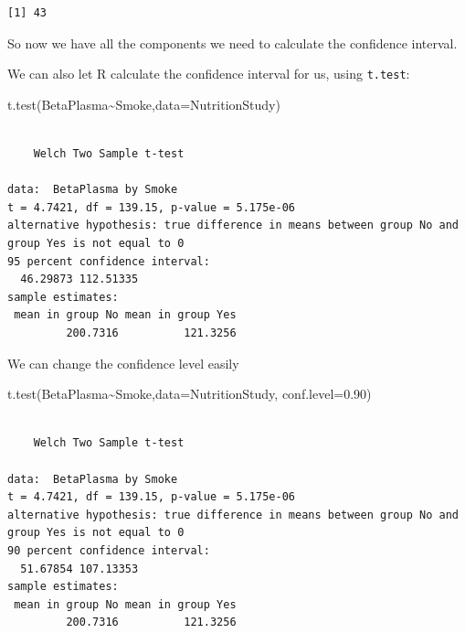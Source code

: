 \documentclass[
  letterpaper,
  DIV=11,
  numbers=noendperiod]{scrartcl}
\newenvironment{Shaded}{\begin{snugshade}}{\end{snugshade}}
\newcommand{\AttributeTok}[1]{\textcolor[rgb]{0.40,0.45,0.13}{#1}}
\newcommand{\FloatTok}[1]{\textcolor[rgb]{0.68,0.00,0.00}{#1}}
\newcommand{\FunctionTok}[1]{\textcolor[rgb]{0.28,0.35,0.67}{#1}}
\newcommand{\NormalTok}[1]{\textcolor[rgb]{0.00,0.23,0.31}{#1}}
\newcommand{\SpecialCharTok}[1]{\textcolor[rgb]{0.37,0.37,0.37}{#1}}
\begin{document}
\begin{verbatim}
[1] 43
\end{verbatim}

So now we have all the components we need to calculate the confidence
interval.

\hfill\break
\hfill\break
\hfill\break
\hfill\break
\hfill\break
\hfill\break
\hfill\break
\hfill\break
\hfill\break
\hfill\break

\newpage

We can also let R calculate the confidence interval for us, using
\texttt{t.test}:

\begin{Shaded}
\begin{Highlighting}[]
\FunctionTok{t.test}\NormalTok{(BetaPlasma}\SpecialCharTok{\textasciitilde{}}\NormalTok{Smoke,}\AttributeTok{data=}\NormalTok{NutritionStudy)}
\end{Highlighting}
\end{Shaded}

\begin{verbatim}

    Welch Two Sample t-test

data:  BetaPlasma by Smoke
t = 4.7421, df = 139.15, p-value = 5.175e-06
alternative hypothesis: true difference in means between group No and group Yes is not equal to 0
95 percent confidence interval:
  46.29873 112.51335
sample estimates:
 mean in group No mean in group Yes 
         200.7316          121.3256 
\end{verbatim}

We can change the confidence level easily

\begin{Shaded}
\begin{Highlighting}[]
\FunctionTok{t.test}\NormalTok{(BetaPlasma}\SpecialCharTok{\textasciitilde{}}\NormalTok{Smoke,}\AttributeTok{data=}\NormalTok{NutritionStudy, }\AttributeTok{conf.level=}\FloatTok{0.90}\NormalTok{)}
\end{Highlighting}
\end{Shaded}

\begin{verbatim}

    Welch Two Sample t-test

data:  BetaPlasma by Smoke
t = 4.7421, df = 139.15, p-value = 5.175e-06
alternative hypothesis: true difference in means between group No and group Yes is not equal to 0
90 percent confidence interval:
  51.67854 107.13353
sample estimates:
 mean in group No mean in group Yes 
         200.7316          121.3256 
\end{verbatim}
\end{document}
